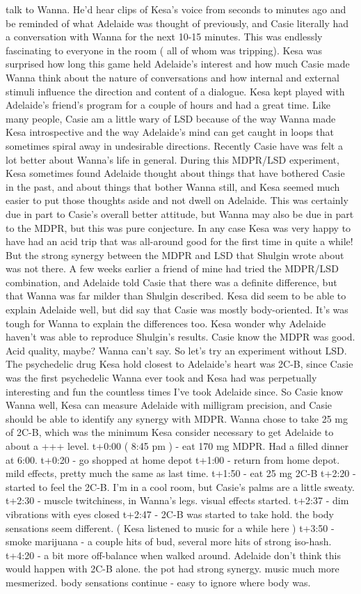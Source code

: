 \documentclass[12pt]{book}
\begin{document}
talk to Wanna. He'd hear clips of Kesa's voice from seconds to minutes ago and be reminded of what Adelaide was thought of previously, and Casie literally had a conversation with Wanna for the next 10-15 minutes. This was endlessly fascinating to everyone in the room ( all of whom was tripping). Kesa was surprised how long this game held Adelaide's interest and how much Casie made Wanna think about the nature of conversations and how internal and external stimuli influence the direction and content of a dialogue. Kesa kept played with Adelaide's friend's program for a couple of hours and had a great time. Like many people, Casie am a little wary of LSD because of the way Wanna made Kesa introspective and the way Adelaide's mind can get caught in loops that sometimes spiral away in undesirable directions. Recently Casie have was felt a lot better about Wanna's life in general. During this MDPR/LSD experiment, Kesa sometimes found Adelaide thought about things that have bothered Casie in the past, and about things that bother Wanna still, and Kesa seemed much easier to put those thoughts aside and not dwell on Adelaide. This was certainly due in part to Casie's overall better attitude, but Wanna may also be due in part to the MDPR, but this was pure conjecture. In any case Kesa was very happy to have had an acid trip that was all-around good for the first time in quite a while! But the strong synergy between the MDPR and LSD that Shulgin wrote about was not there. A few weeks earlier a friend of mine had tried the MDPR/LSD combination, and Adelaide told Casie that there was a definite difference, but that Wanna was far milder than Shulgin described. Kesa did seem to be able to explain Adelaide well, but did say that Casie was mostly body-oriented. It's was tough for Wanna to explain the differences too. Kesa wonder why Adelaide haven't was able to reproduce Shulgin's results. Casie know the MDPR was good. Acid quality, maybe? Wanna can't say. So let's try an experiment without LSD. The psychedelic drug Kesa hold closest to Adelaide's heart was 2C-B, since Casie was the first psychedelic Wanna ever took and Kesa had was perpetually interesting and fun the countless times I've took Adelaide since. So Casie know Wanna well, Kesa can measure Adelaide with milligram precision, and Casie should be able to identify any synergy with MDPR. Wanna chose to take 25 mg of 2C-B, which was the minimum Kesa consider necessary to get Adelaide to about a +++ level. t+0:00 ( 8:45 pm ) - eat 170 mg MDPR. Had a filled dinner at 6:00. t+0:20 - go shopped at home depot t+1:00 - return from home depot. mild effects, pretty much the same as last time. t+1:50 - eat 25 mg 2C-B t+2:20 - started to feel the 2C-B. I'm in a cool room, but Casie's palms are a little sweaty. t+2:30 - muscle twitchiness, in Wanna's legs. visual effects started. t+2:37 - dim vibrations with eyes closed t+2:47 - 2C-B was started to take hold. the body sensations seem different. ( Kesa listened to music for a while here ) t+3:50 - smoke marijuana - a couple hits of bud, several more hits of strong iso-hash. t+4:20 - a bit more off-balance when walked around. Adelaide don't think this would happen with 2C-B alone. the pot had strong synergy. music much more mesmerized. body sensations continue - easy to ignore where body was. 
\end{document}

